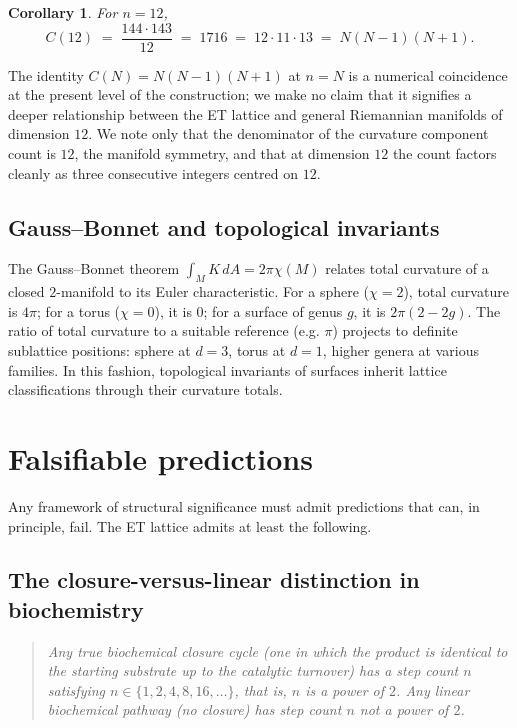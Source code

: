 \documentclass[11pt,a4paper]{article}
\newtheorem{corollary}[theorem]{Corollary}
\theoremstyle{definition}
\theoremstyle{remark}
\begin{document}
\begin{corollary}\label{cor:1716}
For $n=12$,
\[
C(12) \;=\; \frac{144\cdot 143}{12} \;=\; 1716 \;=\; 12\cdot 11\cdot 13 \;=\; N(N-1)(N+1).
\]
\end{corollary}

The identity $C(N) = N(N-1)(N+1)$ at $n=N$ is a numerical coincidence at the present level of the construction; we make no claim that it signifies a deeper relationship between the ET lattice and general Riemannian manifolds of dimension $12$. We note only that the denominator of the curvature component count is $12$, the manifold symmetry, and that at dimension $12$ the count factors cleanly as three consecutive integers centred on $12$.

\subsection{Gauss--Bonnet and topological invariants}

The Gauss--Bonnet theorem $\int_{M}K\,dA = 2\pi\chi(M)$ relates total curvature of a closed $2$-manifold to its Euler characteristic. For a sphere ($\chi=2$), total curvature is $4\pi$; for a torus ($\chi=0$), it is $0$; for a surface of genus $g$, it is $2\pi(2-2g)$. The ratio of total curvature to a suitable reference (e.g. $\pi$) projects to definite sublattice positions: sphere at $d=3$, torus at $d=1$, higher genera at various families. In this fashion, topological invariants of surfaces inherit lattice classifications through their curvature totals.

\section{Falsifiable predictions}\label{sec:predictions}

Any framework of structural significance must admit predictions that can, in principle, fail. The ET lattice admits at least the following.

\subsection{The closure-versus-linear distinction in biochemistry}

\begin{quote}\itshape
Any true biochemical closure cycle (one in which the product is identical to the starting substrate up to the catalytic turnover) has a step count $n$ satisfying $n\in\{1,2,4,8,16,\ldots\}$, that is, $n$ is a power of $2$. Any linear biochemical pathway (no closure) has step count $n$ not a power of $2$.
\end{quote}
\end{document}
